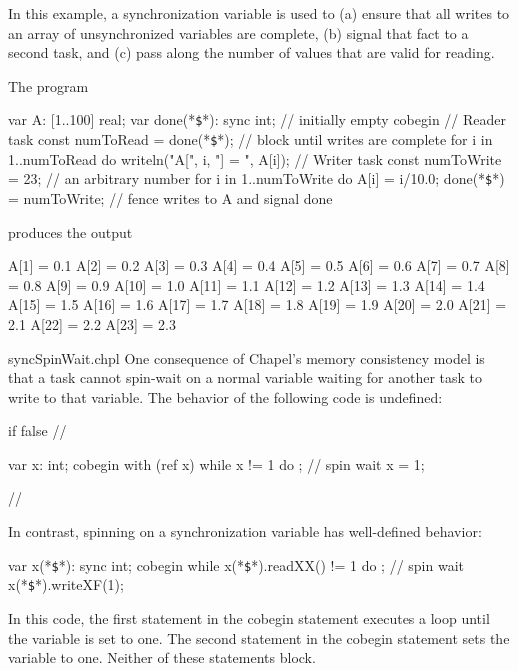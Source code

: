 \begin{example}
  In this example, a synchronization variable is used to (a) ensure that
  all writes to an array of unsynchronized variables are complete, (b)
  signal that fact to a second task, and (c) pass along the number of
  values that are valid for reading.

  The program
\begin{chapel}
var A: [1..100] real;
var done(*\texttt{\$}*): sync int;           // initially empty
cobegin {
  { // Reader task
    const numToRead = done(*\texttt{\$}*);   // block until writes are complete
    for i in 1..numToRead do
      writeln("A[", i, "] = ", A[i]);
  }
  {  // Writer task
    const numToWrite = 23;     // an arbitrary number
    for i in 1..numToWrite do
      A[i] = i/10.0;
    done(*\texttt{\$}*) = numToWrite;        // fence writes to A and signal done
  }
}
\end{chapel}
  produces the output
\begin{chapelprintoutput}{}
A[1] = 0.1
A[2] = 0.2
A[3] = 0.3
A[4] = 0.4
A[5] = 0.5
A[6] = 0.6
A[7] = 0.7
A[8] = 0.8
A[9] = 0.9
A[10] = 1.0
A[11] = 1.1
A[12] = 1.2
A[13] = 1.3
A[14] = 1.4
A[15] = 1.5
A[16] = 1.6
A[17] = 1.7
A[18] = 1.8
A[19] = 1.9
A[20] = 2.0
A[21] = 2.1
A[22] = 2.2
A[23] = 2.3
\end{chapelprintoutput}
\end{example}


\begin{chapelexample}{syncSpinWait.chpl}
One consequence of Chapel's memory consistency model is that a task cannot spin-wait on a
normal variable waiting for another task to write to that variable.  The behavior of
the following code is undefined:

\begin{chapelpre}
if false { // }
\end{chapelpre}
\begin{chapel}
var x: int;
cobegin with (ref x) {
  while x != 1 do ;  // spin wait
  x = 1;
}
\end{chapel}
\begin{chapelnoprint}
// {
}
\end{chapelnoprint}
In contrast, spinning on a synchronization variable has well-defined
behavior:
\begin{chapel}
var x(*\texttt{\$}*): sync int;
cobegin {
  while x(*\texttt{\$}*).readXX() != 1 do ;  // spin wait
  x(*\texttt{\$}*).writeXF(1);
}
\end{chapel}
\begin{chapeloutput}
\end{chapeloutput}

In this code, the first statement in the cobegin statement executes a
loop until the variable is set to one.  The second statement in the
cobegin statement sets the variable to one.  Neither of these
statements block.
\end{chapelexample}

